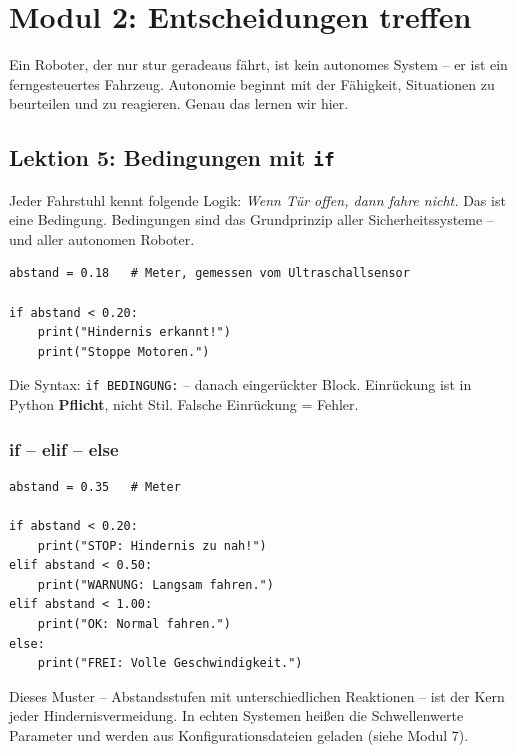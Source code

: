 \chapter{Modul 2: Entscheidungen treffen}

Ein Roboter, der nur stur geradeaus fährt, ist kein autonomes System -- er ist ein ferngesteuertes Fahrzeug. Autonomie beginnt mit der Fähigkeit, Situationen zu beurteilen und zu reagieren. Genau das lernen wir hier.

\section{Lektion 5: Bedingungen mit \texttt{if}}

\begin{analogie}
Jeder Fahrstuhl kennt folgende Logik: \textit{Wenn Tür offen, dann fahre nicht.} Das ist eine Bedingung. Bedingungen sind das Grundprinzip aller Sicherheitssysteme -- und aller autonomen Roboter.
\end{analogie}

\begin{lstlisting}
abstand = 0.18   # Meter, gemessen vom Ultraschallsensor

if abstand < 0.20:
    print("Hindernis erkannt!")
    print("Stoppe Motoren.")
\end{lstlisting}

\begin{merksatz}
Die Syntax: \texttt{if BEDINGUNG:} -- danach eingerückter Block. Einrückung ist in Python \textbf{Pflicht}, nicht Stil. Falsche Einrückung = Fehler.
\end{merksatz}

\subsection*{if -- elif -- else}

\begin{lstlisting}
abstand = 0.35   # Meter

if abstand < 0.20:
    print("STOP: Hindernis zu nah!")
elif abstand < 0.50:
    print("WARNUNG: Langsam fahren.")
elif abstand < 1.00:
    print("OK: Normal fahren.")
else:
    print("FREI: Volle Geschwindigkeit.")
\end{lstlisting}

\begin{praxis}
Dieses Muster -- Abstandsstufen mit unterschiedlichen Reaktionen -- ist der Kern jeder Hindernisvermeidung. In echten Systemen heißen die Schwellenwerte Parameter und werden aus Konfigurationsdateien geladen (siehe Modul 7).
\end{praxis}

